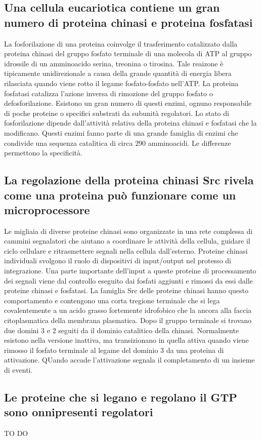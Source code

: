 \subsection{Una cellula eucariotica contiene un gran numero di proteina chinasi e proteina fosfatasi}
La fosforilazione di una proteina coinvolge il trasferimento catalizzato dalla proteina chinasi del gruppo fosfato terminale di una molecola di ATP al gruppo idrossile di un amminoacido 
serina, treonina o tirosina. Tale reaizone \`e tipicamente unidirezionale a causa della grande quantit\`a di energia libera rilasciata quando viene rotto il legame fosfato-fosfato 
nell'ATP. La proteina fosfatasi catalizza l'azione inversa di rimozione del gruppo fosfato o defosforilazione. Esistono un gran numero di questi enzimi, ognuno responsabile di 
poche proteine o specifici substrati  da subunit\`a regolatori. Lo stato di fosforilazione dipende dall'attivit\`a relativa della proteina chinasi e fosfatasi che la modificano.
Questi enzimi fanno parte di una grande famiglia di enzimi che condivide una sequenza catalitica di circa $290$ amminoacidi. Le differenze permettono la specificit\`a. 
\subsection{La regolazione della proteina chinasi Src rivela come una proteina pu\`o funzionare come un microprocessore}
Le migliaia di diverse proteine chinasi sono organizzate in una rete complessa di cammini segnalatori che aiutano a coordinare le attivit\`a della cellula, guidare il ciclo cellulare e 
ritrasmettere segnali nella cellula dall'esterno. Proteine chinasi individuali svolgono il ruolo di dispositivi di input/output nel protesso di integrazione. Una parte importante 
dell'input a queste proteine di processamento dei segnali viene dal controllo eseguito dai fosfati aggiunti e rimossi da essi dalle proteine chinasi e fosfatasi. La famiglia Src delle
proteine chinasi hanno questo comportamento e contengono una corta tregione  terminale che si lega covalentemente a un acido grasso fortemente idrofobico che la ancora alla
faccia citoplasmatica della membrana plasmatica. Dopo il gruppo terminale si trovano due domini 3 e 2 seguiti da il dominio catalitico della chinasi. Normalmente esistono 
nella versione inattiva, ma transizionano in quella attiva quando viene rimosso il fosfato  terminale al legame del dominio 3 da una proteina di attivazione. QUando accade
l'attivazione segnala il completamento di un insieme di eventi. 
\subsection{Le proteine che si legano e regolano il GTP sono onnipresenti regolatori}




\begin{Huge}
	TO DO
\end{Huge}
